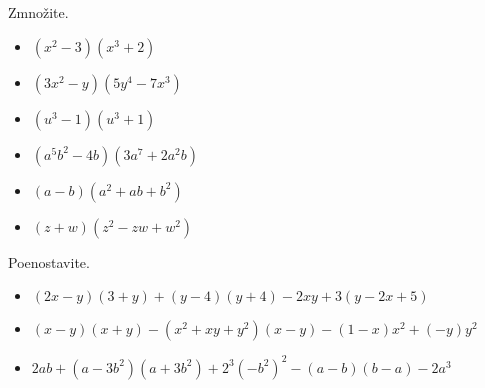     
        
            \begin{naloga}
                Zmnožite.
                \begin{itemize}
                    \item $(x^2-3)(x^3+2)$ 
                    \item $(3x^2-y)(5y^4-7x^3)$ 
                    \item $(u^3-1)(u^3+1)$ 
                    \item $(a^5b^2-4b)(3a^7+2a^2b)$ 
                    \item $(a-b)(a^2+ab+b^2)$ 
                    \item $(z+w)(z^2-zw+w^2)$ 
                \end{itemize}
            \end{naloga}
        
    
        
            \begin{naloga}
                Poenostavite.
                \begin{itemize}
                    \item $(2x-y)(3+y)+(y-4)(y+4)-2xy+3(y-2x+5)$ 
                    \item $(x-y)(x+y)-(x^2+xy+y^2)(x-y)-(1-x)x^2+(-y)y^2$ 
                    \item $2ab+(a-3b^2)(a+3b^2)+2^3(-b^2)^2-(a-b)(b-a)-2a^3$  
                \end{itemize}
            \end{naloga}
        
    